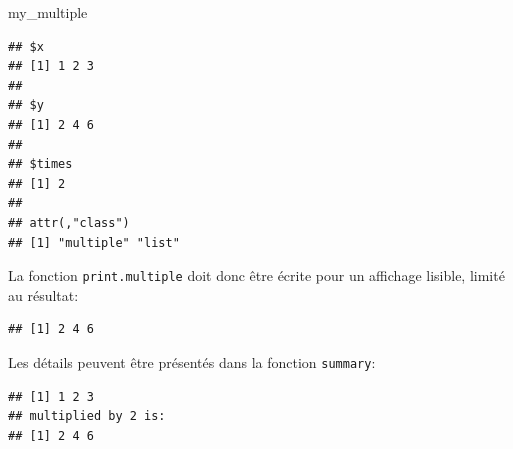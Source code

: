 \documentclass[
  12pt,
  french,
  a4paper,
  extrafontsizes,onecolumn,openright
  ]{memoir}
\newenvironment{Shaded}{\begin{snugshade}}{\end{snugshade}}
\newcommand{\CharTok}[1]{\textcolor[rgb]{0.31,0.60,0.02}{#1}}
\newcommand{\CommentTok}[1]{\textcolor[rgb]{0.56,0.35,0.01}{\textit{#1}}}
\newcommand{\ControlFlowTok}[1]{\textcolor[rgb]{0.13,0.29,0.53}{\textbf{#1}}}
\newcommand{\KeywordTok}[1]{\textcolor[rgb]{0.13,0.29,0.53}{\textbf{#1}}}
\newcommand{\NormalTok}[1]{#1}
\newcommand{\OperatorTok}[1]{\textcolor[rgb]{0.81,0.36,0.00}{\textbf{#1}}}
\newcommand{\StringTok}[1]{\textcolor[rgb]{0.31,0.60,0.02}{#1}}
\begin{document}
\scriptsize

\begin{Shaded}
\begin{Highlighting}[]
\NormalTok{my_multiple}
\end{Highlighting}
\end{Shaded}

\begin{verbatim}
## $x
## [1] 1 2 3
## 
## $y
## [1] 2 4 6
## 
## $times
## [1] 2
## 
## attr(,"class")
## [1] "multiple" "list"
\end{verbatim}

\normalsize

La fonction \texttt{print.multiple} doit donc être écrite pour un affichage lisible, limité au résultat:

\scriptsize

\begin{Shaded}
\end{Shaded}

\begin{verbatim}
## [1] 2 4 6
\end{verbatim}

\normalsize

Les détails peuvent être présentés dans la fonction \texttt{summary}:

\scriptsize

\begin{Shaded}
\end{Shaded}

\begin{verbatim}
## [1] 1 2 3
## multiplied by 2 is:
## [1] 2 4 6
\end{verbatim}
\end{document}
